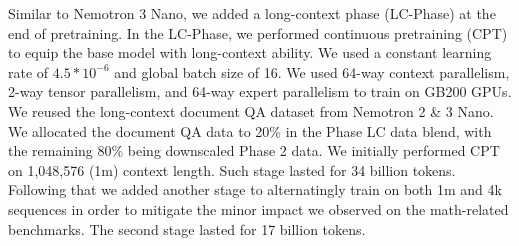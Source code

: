 Similar to Nemotron 3 Nano, we added a long-context phase (LC-Phase) at the end of pretraining. In the LC-Phase, we performed continuous pretraining (CPT) to equip the base model with long-context ability. We used a constant learning rate of $4.5*10^{-6}$ and global batch size of 16. We used 64-way context parallelism, 2-way tensor parallelism, and 64-way expert parallelism to train on GB200 GPUs. We reused the long-context document QA dataset from Nemotron 2 \& 3 Nano. We allocated the document QA data to 20\% in the Phase LC data blend, with the remaining 80\% being downscaled Phase 2 data. We initially performed CPT on 1,048,576 (1m) context length. Such stage lasted for 34 billion tokens. Following that we added another stage to alternatingly train on both 1m and 4k sequences in order to mitigate the minor impact we observed on the math-related benchmarks. The second stage lasted for 17 billion tokens.

